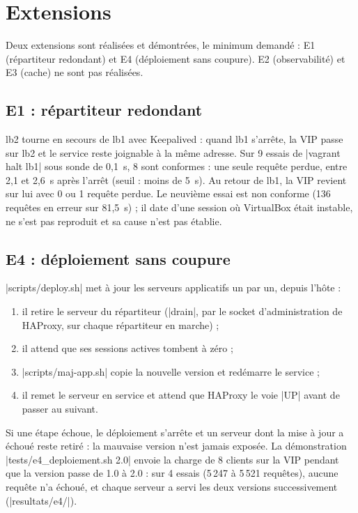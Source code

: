 \documentclass[a4paper,11pt]{article}
\begin{document}
\section{Extensions}

Deux extensions sont réalisées et démontrées, le minimum demandé : E1 (répartiteur redondant) et E4 (déploiement sans coupure). E2 (observabilité) et E3 (cache) ne sont pas réalisées.

\subsection{E1 : répartiteur redondant}

lb2 tourne en secours de lb1 avec Keepalived : quand lb1 s'arrête, la VIP passe sur lb2 et le service reste joignable à la même adresse. Sur 9 essais de |vagrant halt lb1| sous sonde de 0,1~s, 8 sont conformes : une seule requête perdue, entre 2,1 et 2,6~s après l'arrêt (seuil : moins de 5~s). Au retour de lb1, la VIP revient sur lui avec 0 ou 1 requête perdue. Le neuvième essai est non conforme (136 requêtes en erreur sur 81,5~s) ; il date d'une session où VirtualBox était instable, ne s'est pas reproduit et sa cause n'est pas établie.

\subsection{E4 : déploiement sans coupure}

|scripts/deploy.sh| met à jour les serveurs applicatifs un par un, depuis l'hôte :
\begin{enumerate}
  \item il retire le serveur du répartiteur (|drain|, par le socket d'administration de HAProxy, sur chaque répartiteur en marche) ;
  \item il attend que ses sessions actives tombent à zéro ;
  \item |scripts/maj-app.sh| copie la nouvelle version et redémarre le service ;
  \item il remet le serveur en service et attend que HAProxy le voie |UP| avant de passer au suivant.
\end{enumerate}

Si une étape échoue, le déploiement s'arrête et un serveur dont la mise à jour a échoué reste retiré : la mauvaise version n'est jamais exposée. La démonstration |tests/e4_deploiement.sh 2.0| envoie la charge de 8 clients sur la VIP pendant que la version passe de 1.0 à 2.0 : sur 4 essais (5\,247 à 5\,521 requêtes), aucune requête n'a échoué, et chaque serveur a servi les deux versions successivement (|resultats/e4/|).
\end{document}

